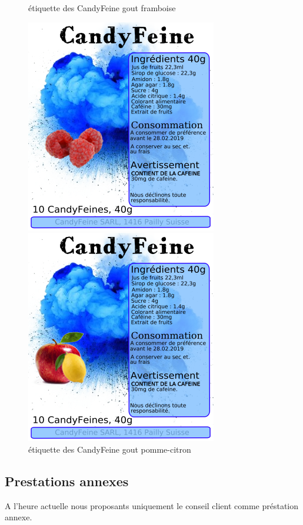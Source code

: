 \documentclass{article}
\begin{document}
\begin{figure}[H]
\centering
   \caption{\label{étiquette} étiquette des CandyFeine gout framboise}
   \includegraphics[scale=1]{../img/designEtiquettes_Framboise.png}

   \caption{\label{étiquette} étiquette des CandyFeine gout pomme-citron}
   \includegraphics[scale=1]{../img/designEtiquettes_pommeCitron.png}

\end{figure}


\subsection{Prestations annexes}
A l'heure actuelle nous proposants uniquement le conseil client comme préstation annexe.
\end{document}
